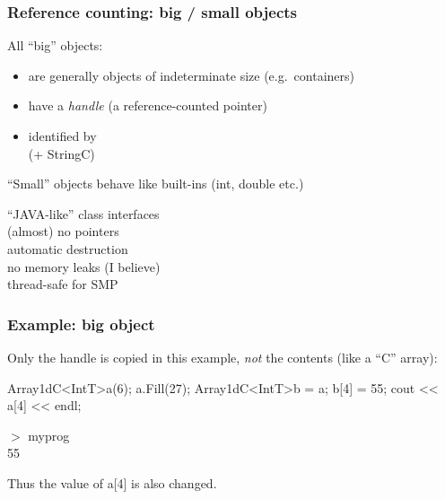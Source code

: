 \documentclass[landscape]{beamer}
\begin{document}
\begin{frame}  \frametitle{Reference counting: big / small objects}
All ``big'' objects:

\begin{itemize}
\pause\item are generally objects of indeterminate size (e.g.\ containers)
\pause\item have a \emph{handle} (a reference-counted pointer)
\pause\item identified by \\ (+ StringC)
\end{itemize}

\vfill\pause ``Small'' objects behave like built-ins (int, double etc.)\vfill


    \pause{\color{blue}$\longrightarrow$} ``JAVA-like'' class interfaces\\
    \pause{\color{blue}$\longrightarrow$} (almost) no pointers\\
    \pause{\color{blue}$\longrightarrow$} automatic destruction \\
    \pause{\color{blue}$\longrightarrow$} no memory leaks (I believe)\\
    \pause{\color{blue}$\longrightarrow$} thread-safe for SMP \\
        
\end{frame}


\begin{frame}[fragile]\frametitle{Example: big object}


 Only the handle is copied in this example, \emph{not} the contents (like a ``C'' array):
  
\begin{Code}
  Array1dC<IntT>a(6);
  a.Fill(27);
  Array1dC<IntT>b = a;
  b[4] = 55;
  cout << a[4] << endl;
\end{Code}

{\footnotesize\color{xterm}$>$ myprog\\55}

\vspace{1em}

Thus the value of a[4] is also changed.


\end{frame}
\end{document}
